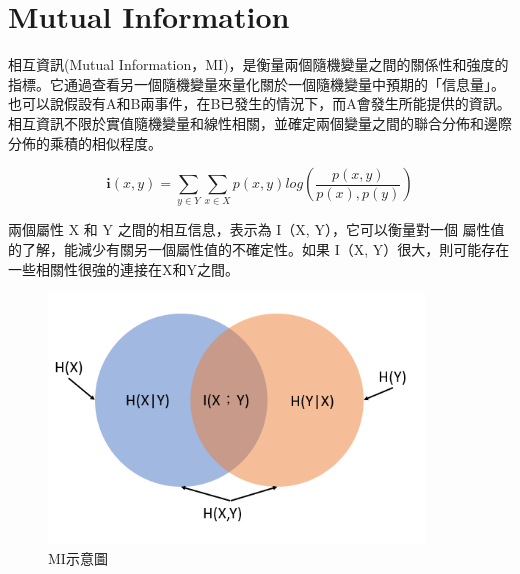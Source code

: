 \chapter{Mutual Information}
\label{chapter:intro}
相互資訊(Mutual Information，MI)，是衡量兩個隨機變量之間的關係性和強度的指標。它通過查看另一個隨機變量來量化關於一個隨機變量中預期的「信息量」。也可以說假設有A和B兩事件，在B已發生的情況下，而A會發生所能提供的資訊。相互資訊不限於實值隨機變量和線性相關，並確定兩個變量之間的聯合分佈和邊際分佈的乘積的相似程度。



$$\textbf{i}(x,y)=\sum_{y\in Y}^{}\sum_{x\in X}^{}p(x,y)log(\frac{p(x,y)}{p(x),p(y)})$$

        兩個屬性 X 和 Y 之間的相互信息，表示為 I（X, Y），它可以衡量對一個 屬性值的了解，能減少有關另一個屬性值的不確定性。如果 I（X, Y）很大，則可能存在一些相關性很強的連接在X和Y之間。

        \begin{figure}[h]
            \centering
            \includegraphics[width=10cm]{./pic/MI.PNG}
            \caption{MI示意圖}
            \label{fig:MI}
        \end{figure}

